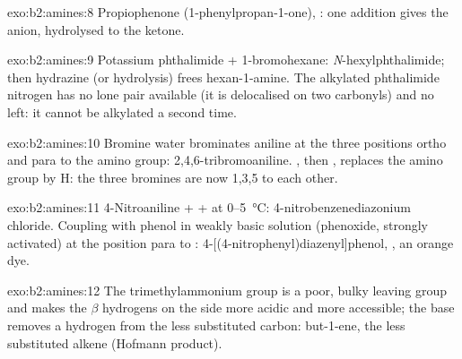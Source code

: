 \begin{solution}{exo:b2:amines:8}
Propiophenone (1-phenylpropan-1-one), : one addition gives the  anion,
hydrolysed to the ketone.
\end{solution}

\begin{solution}{exo:b2:amines:9}
Potassium phthalimide + 1-bromohexane: \textit{N}-hexylphthalimide; then hydrazine (or hydrolysis)
frees hexan-1-amine. The alkylated phthalimide nitrogen has no lone pair available (it is
delocalised on two carbonyls) and no  left: it cannot be alkylated a second time.
\end{solution}

\begin{solution}{exo:b2:amines:10}
Bromine water brominates aniline at the three positions ortho and para to the amino
group: 2,4,6-tribromoaniline. , then , replaces the amino group by H: the three
bromines are now 1,3,5 to each other.
\end{solution}

\begin{solution}{exo:b2:amines:11}
4-Nitroaniline +  +  at 0--\qty{5}{\degreeCelsius}: 4-nitrobenzenediazonium
chloride. Coupling with phenol in weakly basic solution (phenoxide, strongly activated) at the
position para to : 4-[(4-nitrophenyl)diazenyl]phenol, , an orange
dye.
\end{solution}

\begin{solution}{exo:b2:amines:12}
The trimethylammonium group is a poor, bulky leaving group and makes the $\beta$ hydrogens on the
 side more acidic and more accessible; the base removes a hydrogen from the less
substituted carbon: but-1-ene, the less substituted alkene (Hofmann product).
\end{solution}

